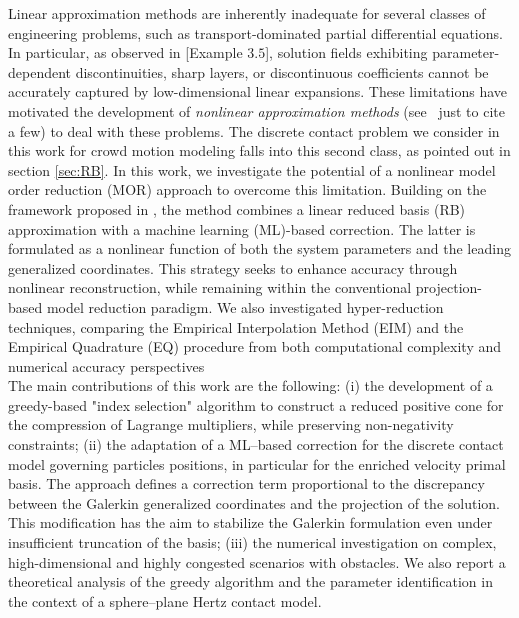 Linear approximation methods are inherently inadequate for several classes of engineering problems, such as transport-dominated partial differential equations. In particular, as observed in \cite{haasdonk2013convergence}[Example $3.5$], solution fields exhibiting parameter-dependent discontinuities, sharp layers, or discontinuous coefficients cannot be accurately captured by low-dimensional linear expansions. These limitations have motivated the development of \emph{nonlinear approximation methods} (see~\cite{cohen2023nonlinear, barnett2023neural, carlberg2011efficient,franco2023deep,ehrlacher2020nonlinear} just to cite a few) to deal with these problems. The discrete contact problem we consider in this work for crowd motion modeling falls into this second class, as pointed out in section
\ref{sec:RB}. %
In this work, we investigate the potential of a nonlinear model order reduction (MOR) approach to overcome this limitation. Building on the framework proposed in \cite{cohen2023nonlinear}, the method combines a linear reduced basis (RB) approximation with a machine learning (ML)-based correction. The latter is formulated as a nonlinear function of both the system parameters and the leading generalized coordinates. This strategy seeks to enhance accuracy through nonlinear reconstruction, while remaining within the conventional projection-based model reduction paradigm. We also investigated hyper-reduction techniques, comparing the Empirical Interpolation Method (EIM) and the Empirical Quadrature (EQ) procedure from both computational complexity and numerical accuracy perspectives\\
The main contributions of this work are the following: (i) the development of a greedy-based "index selection" algorithm to construct a reduced positive cone for the compression of Lagrange multipliers, while preserving non-negativity constraints; (ii) the adaptation of a ML–based correction for the discrete contact model governing particles positions, in particular for the enriched velocity primal basis. The approach defines a correction term proportional to the discrepancy between the Galerkin generalized coordinates and the projection of the solution. This modification has the aim to stabilize the Galerkin formulation even under insufficient truncation of the basis; (iii) the numerical investigation on complex, high-dimensional and highly congested scenarios with obstacles. We also report a theoretical analysis of the greedy algorithm and the parameter identification in the context of a sphere–plane Hertz contact model.\\
